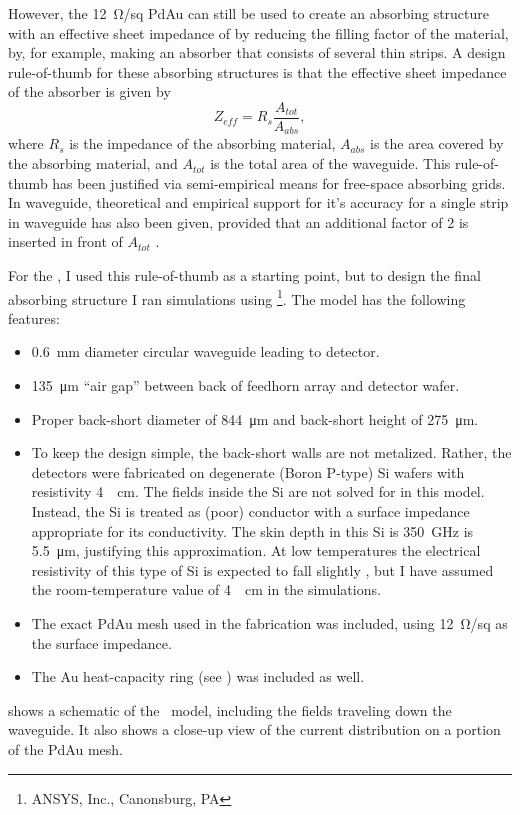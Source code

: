 However, the \SI{12}{\ohm}/sq PdAu can still be used to create an absorbing structure with an effective sheet impedance of  by reducing the filling factor of the material, by, for example, making an absorber that consists of several thin strips.
A design rule-of-thumb for these absorbing structures is that the effective sheet impedance of the absorber is given by 
\begin{equation} \label{eqn:ch4-imp-fill-factor}
  Z_{eff} = R_s \frac{A_{tot}}{A_{abs}},
\end{equation}
where $R_s$ is the impedance of the absorbing material, $A_{abs}$ is the area covered by the absorbing material, and $A_{tot}$ is the total area of the waveguide.
This rule-of-thumb has been justified via semi-empirical means \cite{ulrich_far-infrared_1967,whitbourn_equivalent-circuit_1985} for free-space absorbing grids.
In waveguide, theoretical and empirical support for it's accuracy for a single strip in waveguide has also been given, provided that an additional factor of 2 is inserted in front of $A_{tot}$ \cite{datesman_analytical_2011}.

For the \Imager, I used this rule-of-thumb as a starting point, but to design the final absorbing structure I ran simulations using \HFSS\footnote{ANSYS, Inc., Canonsburg, PA}.
The model has the following features:
\begin{itemize}
\item \SI{0.6}{\mm} diameter circular waveguide leading to detector.
\item \SI{135}{\um} ``air gap'' between back of feedhorn array and detector wafer.
\item Proper back-short diameter of \SI{844}{\um} and back-short height of \SI{275}{\um}.
\item To keep the design simple, the back-short walls are not metalized.
      Rather, the detectors were fabricated on degenerate (Boron P-type) Si wafers with resistivity \SI{4}{\mOhm\cm}.
      The fields inside the Si are not solved for in this model.
      Instead, the Si is treated as (poor) conductor with a surface impedance appropriate for its conductivity.
      The skin depth in this Si is \SI{350}{\GHz} is \SI{5.5}{\um}, justifying this approximation.
      At low temperatures the electrical resistivity of this type of Si is expected to fall slightly \cite{chapman_electrical_1963}, but I have assumed the room-temperature value of \SI{4}{\mOhm\cm} in the simulations.
\item The exact PdAu mesh used in the fabrication was included, using \SI{12}{\ohm}/sq as the surface impedance.
\item The Au heat-capacity ring (see ) was included as well.
\end{itemize}
 shows a schematic of the \HFSS\ model, including the fields traveling down the waveguide.
It also shows a close-up view of the current distribution on a portion of the PdAu mesh.

